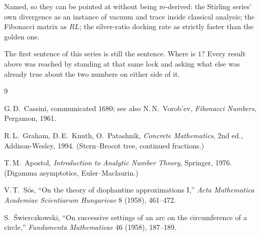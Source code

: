 \documentclass[10pt,a4paper]{article}
\theoremstyle{plain}
\theoremstyle{definition}
\theoremstyle{remark}
\begin{document}
Named, so they can be pointed at without being re-derived: the Stirling series' own divergence as an instance of vacuum and trace inside classical analysis; the Fibonacci matrix as $RL$; the silver-ratio docking rate as strictly faster than the golden one.


The first sentence of this series is still the sentence. Where is $1$? Every result above was reached by standing at that same lock and asking what else was already true about the two numbers on either side of it.

\newpage
\begin{thebibliography}{9}

G.\,D.\ Cassini, communicated 1680; see also N.\,N.\ Vorob'ev, \emph{Fibonacci Numbers}, Pergamon, 1961.

R.\,L.\ Graham, D.\,E.\ Knuth, O.\ Patashnik, \emph{Concrete Mathematics}, 2nd ed., Addison-Wesley, 1994. (Stern--Brocot tree, continued fractions.)

T.\,M.\ Apostol, \emph{Introduction to Analytic Number Theory}, Springer, 1976. (Digamma asymptotics, Euler--Maclaurin.)

V.\,T.\ S\'os, ``On the theory of diophantine approximations I,'' \emph{Acta Mathematica Academiae Scientiarum Hungaricae} 8 (1958), 461--472.

S.\ \'Swierczkowski, ``On successive settings of an arc on the circumference of a circle,'' \emph{Fundamenta Mathematicae} 46 (1958), 187--189.

\end{thebibliography}
\end{document}
